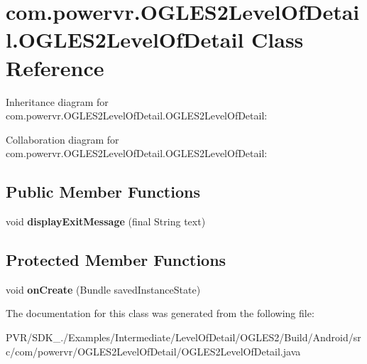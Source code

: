 \hypertarget{classcom_1_1powervr_1_1_o_g_l_e_s2_level_of_detail_1_1_o_g_l_e_s2_level_of_detail}{\section{com.\+powervr.\+O\+G\+L\+E\+S2\+Level\+Of\+Detail.\+O\+G\+L\+E\+S2\+Level\+Of\+Detail Class Reference}
\label{classcom_1_1powervr_1_1_o_g_l_e_s2_level_of_detail_1_1_o_g_l_e_s2_level_of_detail}
}


Inheritance diagram for com.\+powervr.\+O\+G\+L\+E\+S2\+Level\+Of\+Detail.\+O\+G\+L\+E\+S2\+Level\+Of\+Detail\+:


Collaboration diagram for com.\+powervr.\+O\+G\+L\+E\+S2\+Level\+Of\+Detail.\+O\+G\+L\+E\+S2\+Level\+Of\+Detail\+:
\subsection*{Public Member Functions}
\begin{DoxyCompactItemize}
\item 
\hypertarget{classcom_1_1powervr_1_1_o_g_l_e_s2_level_of_detail_1_1_o_g_l_e_s2_level_of_detail_a5bab1a2594500848a4127e05436f7b58}{void {\bfseries display\+Exit\+Message} (final String text)}\label{classcom_1_1powervr_1_1_o_g_l_e_s2_level_of_detail_1_1_o_g_l_e_s2_level_of_detail_a5bab1a2594500848a4127e05436f7b58}

\end{DoxyCompactItemize}
\subsection*{Protected Member Functions}
\begin{DoxyCompactItemize}
\item 
\hypertarget{classcom_1_1powervr_1_1_o_g_l_e_s2_level_of_detail_1_1_o_g_l_e_s2_level_of_detail_abd3076c6fddffc49c5d99d63df0e75f8}{void {\bfseries on\+Create} (Bundle saved\+Instance\+State)}\label{classcom_1_1powervr_1_1_o_g_l_e_s2_level_of_detail_1_1_o_g_l_e_s2_level_of_detail_abd3076c6fddffc49c5d99d63df0e75f8}

\end{DoxyCompactItemize}


The documentation for this class was generated from the following file\+:\begin{DoxyCompactItemize}
\item 
P\+V\+R/\+S\+D\+K\+\_./\+Examples/\+Intermediate/\+Level\+Of\+Detail/\+O\+G\+L\+E\+S2/\+Build/\+Android/src/com/powervr/\+O\+G\+L\+E\+S2\+Level\+Of\+Detail/O\+G\+L\+E\+S2\+Level\+Of\+Detail.\+java\end{DoxyCompactItemize}
